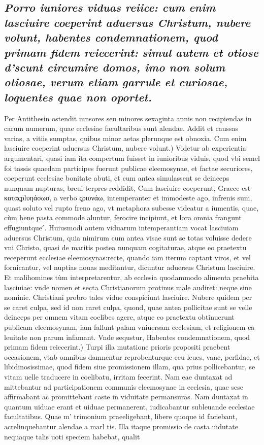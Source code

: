 \documentclass{article}
\begin{document}
\begin{pages}
\subsection*{\textit{Porro iuniores viduas reiice: cum enim lasciuire coeperint aduersus Christum, nubere volunt, habentes condemnationem, quod primam fidem reiecerint: simul autem et otiose d'scunt circumire domos, imo non solum otiosae, verum etiam garrule et curiosae, loquentes quae non oportet. }}\pstart Per Antithesin ostendit iunsores seu minores sexaginta annis non recipiendas in carum numerum, quae ecclesiae facultaribus sunt alendae. Addit et caussas varias, a vitiis sumptas, quibus minor aetas plerunque est obnoxia.  \pend\pstart Cum enim lasciuire coeperint aduersus Christum, nubere volunt.) Videtur ab experientia argumentari, quasi iam ita compertum fuisset in iunioribus viduis, quod vbi semel foi tassis quaedam participes fuerunt publicae eleemosynae, et factae securiores, coeperunt ecclesiae bonitate abuti, et cum antea simulassent se deinceps nunquam nupturas, breui terpres reddidit, Cum lasciuire coeperunt, Graece est καταςρlυηάσωσ, a verbo ςριυνάω, intemperanter et immodeste ago, infrenis sum, quast soluto vel rupto freno ago, vt metaphora subesse videatur a iumentis, quae, cùm bene pasta commode aluntur, ferocire incipiunt, et lora omnia frangunt effugiuntque ́. Huiusmodi autem viduarum intemperantiam vocat lasciuiam aduersus Christum, quia nimirum cum antea visae sunt se totas voluisse dedere vni Christo, quasi de maritis postea nunquam cogitaturae, atque  eo praetextu receperunt ecclesiae eleemosynas:recte, quando iam iterum captant viros, et vel fornicantur, vel nuptias nouas meditantur, dicuntur aduersus Christum lasciuire. Et malihomines tùm interpretarentur, ab ecclesia quodammodo alimenta praebita lasciuiae: vnde nomen et secta Christianorum protinus male audiret: neque sine nominie. Christiani probro tales vidue conspiciunt lasciuire. Nubere quidem per se caret culpa, sed id non caret culpa, quond, quae antea pollicitae sunt se velle deinceps per omnem vitam coelibes agere, atque eo praetextu obtinuerunt publicam eleemosynam, iam fallunt palam vniuersam ecclesiam, et religionem ea leuitate non parum infamant. Vnde sequstur,  \pend\pstart Habentes condemnationem, quod primam fidem reiecerint.) Turpi illa mutatione prioris propositi praebent occasionem, vtab omnibus damnentur reprobenturque ceu leues, vane, perfidae, et libidinosissimae, quod fidem siue promissionem illam, qua prius pollicebantur, se vitam uelle traducere in coelibatu, irritam fecerint. Nam eae duntaxat ad mittebantur ad participationem communis eleemosynae in ecclesia, quae sese affirmabant ac promittebant caste in viduitate permansuras. Nam duntaxat in quantum uiduae erant et uiduae permanerent, iudicabantur subleuande ecclesiae facultatibus. Quae m' trimonium praeeligebant, libere quoque id faciebant, acrelinquebantur alendae a marl tis. Illa itaque promissio de casta uidutate nequaque talis uoti speciem habebat, qualit  \pend

\end{pages}
\end{document}
